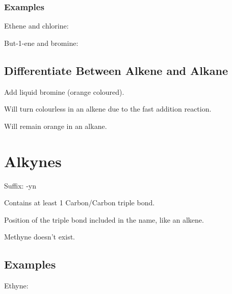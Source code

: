 \documentclass[a4paper,11pt]{article}
\begin{document}
\subsubsection{Examples}

Ethene and chlorine:

\begin{center}
\end{center}

But-1-ene and bromine:

\begin{center}
\end{center}


\subsection{Differentiate Between Alkene and Alkane}

Add liquid bromine (orange coloured).

Will turn colourless in an alkene due to the fast addition reaction.

Will remain orange in an alkane.




\section{Alkynes}

Suffix: -yn

Contains at least 1 Carbon/Carbon triple bond.

Position of the triple bond included in the name, like an alkene.

Methyne doesn't exist.


\subsection{Examples}

Ethyne:

\begin{center}
\end{center}
\end{document}
